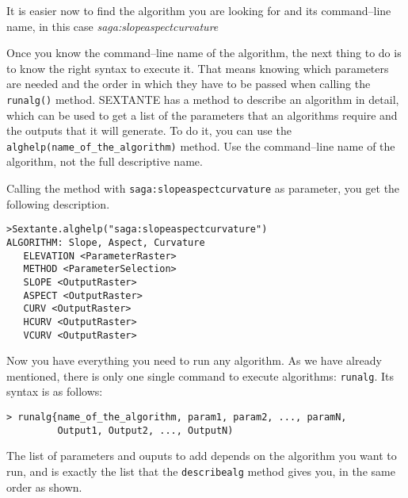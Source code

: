 It is easier now to find the algorithm you are looking for and its command--line name, in this case \emph{saga:slopeaspectcurvature}

Once you know the command--line name of the algorithm, the next thing to do is to know the right syntax to execute it. That means knowing which parameters are needed and the order in which they have to be passed when calling the \texttt{runalg()} method. SEXTANTE has a method to describe an algorithm in detail, which can be used to get a list of the parameters that an algorithms require and the outputs that it will generate. To do it, you can use the \texttt{alghelp(name\_of\_the\_algorithm)} method. Use the command--line name of the algorithm, not the full descriptive name.

Calling the method with \texttt{saga:slopeaspectcurvature} as parameter, you get the following description.

\begin{verbatim}
>Sextante.alghelp("saga:slopeaspectcurvature")
ALGORITHM: Slope, Aspect, Curvature
   ELEVATION <ParameterRaster>
   METHOD <ParameterSelection>
   SLOPE <OutputRaster>
   ASPECT <OutputRaster>
   CURV <OutputRaster>
   HCURV <OutputRaster>
   VCURV <OutputRaster>
\end{verbatim}    

Now you have everything you need to run any algorithm. As we have already mentioned, there is only one single command to execute algorithms: \texttt{runalg}. Its syntax is as follows:

\begin{verbatim}
> runalg{name_of_the_algorithm, param1, param2, ..., paramN, 
         Output1, Output2, ..., OutputN)
\end{verbatim}

The list of parameters and ouputs to add depends on the algorithm you want to run, and is exactly the list that the \texttt{describealg} method gives you, in the same order as shown.

